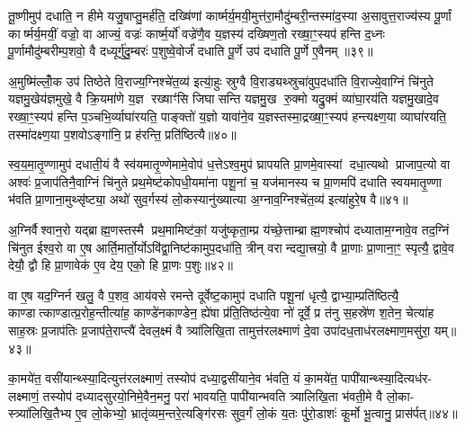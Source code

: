 तू॒ष्णीमुप॑ दधाति॒ न हीमे यजु॒षाप्तु॒मर्\mbox{}ह॑ति॒ दख्षि॑णां कार्ष्मर्य॒मयी॒मुत्त॑रा॒मौदु॑म्बरी॒न्तस्मा॑द॒स्या अ॒सावुत्त॒राज्य॑स्य पू॒र्णां कार्ष्मर्य॒मयीं॒ वज्रो॒ वा आज्यं॒ वज्रः॑ कार्ष्म॒र्यो॑ वज्रे॑णै॒व य॒ज्ञस्य॑ दख्षिण॒तो रख्षा॒ꣳ॒स्यप॑ हन्ति द॒ध्नः पू॒र्णामौदु॑म्बरीम्प॒शवो॒ वै दध्यूर्गु॑दु॒म्बरः॑ प॒शुष्वे॒वोर्जं॑ दधाति पू॒र्णे उप॑ दधाति पू॒र्णे ए॒वैनम्॥३९॥

अ॒मुष्मि॑ल्लोँ॒क उप॑ तिष्ठेते वि॒राज्य॒ग्निश्चे॑त॒व्य॑ इत्या॒॑हुः स्रुग्वै वि॒राड्यथ्स्रुचा॑वुप॒दधा॑ति वि॒राज्ये॒वाग्निं चि॑नुते यज्ञमु॒खेय॑ज्ञमुखे॒ वै क्रि॒यमा॑णे य॒ज्ञ रख्षाꣳ॑सि जिघासन्ति यज्ञमु॒ख रु॒क्मो यद्रु॒क्मं व्या॑घा॒रय॑ति यज्ञमु॒खादे॒व रख्षा॒ꣳ॒स्यप॑ हन्ति प॒ञ्चभि॒र्व्याघा॑रयति॒ पाङ्क्तो॑ य॒ज्ञो यावा॑ने॒व य॒ज्ञस्तस्मा॒द्रख्षा॒ꣳ॒स्यप॑ हन्त्यक्ष्ण॒या व्याघा॑रयति॒ तस्मा॑दक्ष्ण॒या प॒शवोऽङ्गा॑नि॒ प्र ह॑रन्ति॒ प्रति॑ष्ठित्यै॥४०॥

{\anuvakamend[{वन॒स्पत॑यो दख्षिण॒तो ध॑त्त एन॒न्तस्मा॑दक्ष्ण॒या पञ्च॑ च॥७॥}]}

स्व॒य॒मा॒तृ॒ण्णामुप॑ दधाती॒यं वै स्व॑यमातृ॒ण्णेमामे॒वोप॑ ध॒त्तेऽश्व॒मुप॑ घ्रापयति प्रा॒णमे॒वास्यां दधा॒त्यथो प्राजाप॒त्यो वा अश्वः॑ प्र॒जाप॑तिनै॒वाग्निं चि॑नुते प्रथ॒मेष्ट॑कोपधी॒यमा॑ना पशू॒नां च॒ यज॑मानस्य च प्रा॒णमपि॑ दधाति स्वयमातृ॒ण्णा भ॑वति प्रा॒णाना॒मुथ्सृ॑ष्ट्या॒ अथो॑ सुव॒र्गस्य॑ लो॒कस्यानु॑ख्यात्या अ॒ग्नाव॒ग्निश्चे॑त॒व्य॑ इत्या॑हुरे॒ष वै॥४१॥

अ॒ग्निर्वैश्वान॒रो यद्ब्राह्म॒णस्तस्मै प्रथ॒मामिष्ट॑कां॒ यजु॑ष्कृता॒म्प्र य॑च्छे॒त्ताम्ब्राह्म॒णश्चोप॑ दध्याताम॒ग्नावे॒व तद॒ग्निं चि॑नुत ईश्व॒रो वा ए॒ष आर्ति॒मार्तो॒र्योऽवि॑द्वा॒निष्ट॑कामुप॒दधा॑ति॒ त्रीन् वरान्दद्या॒त्त्रयो॒ वै प्रा॒णाः प्रा॒णाना॒ꣳ॒ स्पृत्यै॒ द्वावे॒व देयौ॒ द्वौ हि प्रा॒णावेक॑ ए॒व देय॒ एको॒ हि प्रा॒णः प॒शुः॥४२॥

वा ए॒ष यद॒ग्निर्न खलु॒ वै प॒शव॒ आय॑वसे रमन्ते दूर्वेष्ट॒कामुप॑ दधाति पशू॒नां धृत्यै॒ द्वाभ्या॒म्प्रति॑ष्ठित्यै॒ काण्डात्काण्डात्प्र॒रोह॒न्तीत्या॑ह॒ काण्डे॑नकाण्डेन॒ ह्ये॑षा प्र॑ति॒तिष्ठ॑त्ये॒वा नो॑ दूर्वे॒ प्र त॑नु स॒हस्रे॑ण श॒तेन॒ चेत्या॑ह साह॒स्रः प्र॒जाप॑तिः प्र॒जाप॑ते॒राप्त्यै॑ देवल॒क्ष्मं वै त्र्या॑लिखि॒ता तामुत्त॑रलक्ष्माणं दे॒वा उपा॑दध॒ताध॑रलक्ष्माण॒मसु॑रा॒ यम्॥४३॥

का॒मये॑त॒ वसी॑यान्थ्स्या॒दित्युत्त॑रलक्ष्माणं॒ तस्योप॑ दध्या॒द्वसी॑याने॒व भ॑वति॒ यं का॒मये॑त॒ पापी॑यान्थ्स्या॒दित्यध॑र- लक्ष्माणं॒ तस्योप॑ दध्यादसुरयो॒निमे॒वैन॒मनु॒ परा॑ भावयति॒ पापी॑यान्भवति त्र्यालिखि॒ता भ॑वती॒मे वै लो॒का- स्त्र्या॑लिखि॒तैभ्य ए॒व लो॒केभ्यो॒ भ्रातृ॑व्यम॒न्तरे॒त्यङ्गि॑रसः सुव॒र्गं लो॒कं य॒तः पु॑रो॒डाशः॑ कू॒र्मो भू॒त्वानु॒ प्रास॑र्पत्॥४४॥

